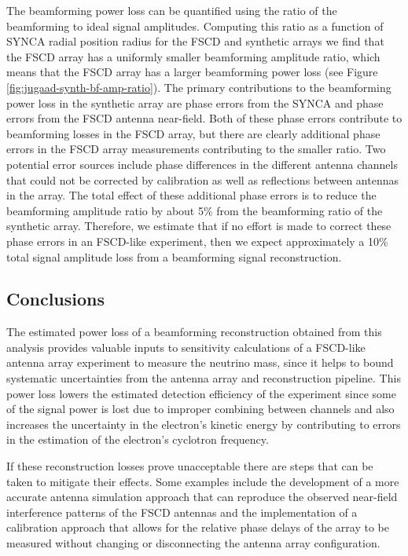 The beamforming power loss can be quantified using the ratio of the beamforming to ideal signal amplitudes. Computing this ratio as a function of SYNCA radial position radius for the FSCD and synthetic arrays we find that the FSCD array has a uniformly smaller beamforming amplitude ratio, which means that the FSCD array has a larger beamforming power loss (see Figure \ref{fig:jugaad-synth-bf-amp-ratio}). The primary contributions to the beamforming power loss in the synthetic array are phase errors from the SYNCA and phase errors from the FSCD antenna near-field. Both of these phase errors contribute to beamforming losses in the FSCD array, but there are clearly additional phase errors in the FSCD array measurements contributing to the smaller ratio. Two potential error sources include phase differences in the different antenna channels that could not be corrected by calibration as well as reflections between antennas in the array. The total effect of these additional phase errors is to reduce the beamforming amplitude ratio by about 5\% from the beamforming ratio of the synthetic array. Therefore, we estimate that if no effort is made to correct these phase errors in an FSCD-like experiment, then we expect approximately a 10\% total signal amplitude loss from a beamforming signal reconstruction. 

\subsection{Conclusions}

The estimated power loss of a beamforming reconstruction obtained from this analysis provides valuable inputs to sensitivity calculations of a FSCD-like antenna array experiment to measure the neutrino mass, since it helps to bound systematic uncertainties from the antenna array and reconstruction pipeline. This power loss lowers the estimated detection efficiency of the experiment since some of the signal power is lost due to improper combining between channels and also increases the uncertainty in the electron's kinetic energy by contributing to errors in the estimation of the electron's cyclotron frequency. 

If these reconstruction losses prove unacceptable there are steps that can be taken to mitigate their effects. Some examples include the development of a more accurate antenna simulation approach that can reproduce the observed near-field interference patterns of the FSCD antennas and the implementation of a calibration approach that allows for the relative phase delays of the array to be measured without changing or disconnecting the antenna array configuration. 